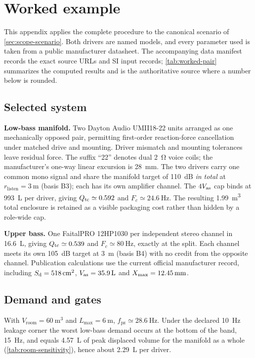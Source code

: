 \section{Worked example}
\label{app:example}

This appendix applies the complete procedure to the canonical scenario of
\cref{sec:scope-scenario}. Both drivers are named models, and every
parameter used is taken from a public manufacturer datasheet. The
accompanying data manifest records the exact source URLs and SI input
records; \cref{tab:worked-pair} summarizes the computed results and is the
authoritative source where a number below is rounded.

\subsection*{Selected system}

\textbf{Low-bass manifold.} Two Dayton Audio UMII18-22 units arranged as
one mechanically opposed pair, permitting first-order reaction-force
cancellation under matched drive and mounting. Driver mismatch and
mounting tolerances leave residual force. The suffix ``22'' denotes dual
\SI{2}{\ohm} voice coils; the manufacturer's one-way linear excursion is
\SI{28}{\milli\meter}. The two drivers carry one common mono signal and share the
manifold target of \SI{110}{dB} \emph{in total} at
$r_{\mathrm{listen}}=\SI{3}{\meter}$ (basis B3); each has its own amplifier
channel. The $4V_{\mathrm{as}}$ cap binds at \SI{993}{\liter} per driver, giving
$Q_{\mathrm{tc}}\simeq0.592$ and $F_c\simeq\SI{24.6}{\hertz}$. The resulting
\SI{1.99}{\cubic\meter} total enclosure is retained as a visible packaging
cost rather than hidden by a role-wide cap.

\textbf{Upper bass.} One FaitalPRO 12HP1030 per independent stereo
channel in \SI{16.6}{\liter}, giving $Q_{\mathrm{tc}}\simeq0.539$ and
$F_c\simeq\SI{80}{\hertz}$, exactly at the split. Each channel meets its
own \SI{105}{dB} target at \SI{3}{\meter} (basis B4) with no credit from
the opposite channel. Publication calculations use the current official
manufacturer record, including $S_{\mathrm{d}}=\SI{518}{\centi\meter\squared}$,
$V_{\mathrm{as}}=\SI{35.9}{\liter}$ and
$X_{\mathrm{max}}=\SI{12.45}{\milli\meter}$.

\subsection*{Demand and gates}

With $V_{\mathrm{room}}=\SI{60}{\cubic\meter}$ and
$L_{\max}=\SI{6}{\meter}$, $f_{\mathrm{pz}}\simeq\SI{28.6}{\hertz}$. Under
the declared \SI{10}{\hertz} leakage corner the worst low-bass demand
occurs at the bottom of the band, \SI{15}{\hertz}, and equals
\SI{4.57}{\liter} of peak displaced volume for the manifold as a whole
(\cref{tab:room-sensitivity}), hence about \SI{2.29}{\liter} per driver.

